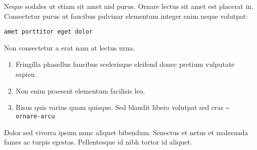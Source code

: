 \documentclass[9pt]{innovativeinnovation-cheatsheet}
\begin{document}
\begin{multicols*}{3}

Neque sodales ut etiam sit amet nisl purus. Ornare lectus sit amet est
placerat in. Consectetur purus ut faucibus pulvinar elementum integer enim
neque volutpat:

\begin{lstlisting}
amet porttitor eget dolor
\end{lstlisting}


Non consectetur a erat nam at lectus urna.

\begin{enumerate}
  \item Fringilla phasellus faucibus scelerisque eleifend donec pretium
        vulputate sapien.
  \item Non enim praesent elementum facilisis leo.
  \item Risus quis varius quam quisque. Sed blandit libero volutpat sed cras
        \texttt{--ornare-arcu}
\end{enumerate}

Dolor sed viverra ipsum nunc aliquet bibendum. Senectus et netus et malesuada
fames ac turpis egestas. Pellentesque id nibh tortor id aliquet.

\vfill


\end{multicols*}
\end{document}
